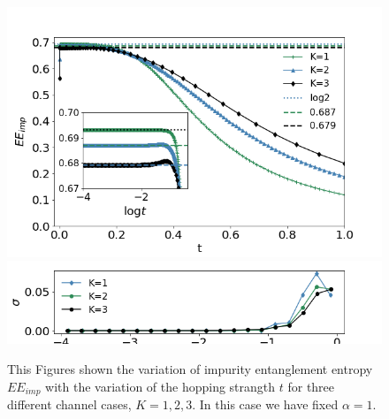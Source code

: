 \documentclass[reprint,prb,superscriptaddress]{revtex4-2}
\begin{document}
\begin{figure}[!htpb]
\centering
\includegraphics[scale=0.42]{plt/A_I1_ch123_['d']}
\includegraphics[scale=0.42]{plt/errorbar_A_I1_ch123_['d']}
\caption{This Figures shown the variation of impurity entanglement entropy $EE_{imp}$ with the variation of the hopping strangth $t$ for three different channel cases, $K=1,2,3$. In this case we have fixed $\alpha=1$.}
\label{fig:EE_imp_vs_t_K}
\end{figure}
\end{document}
